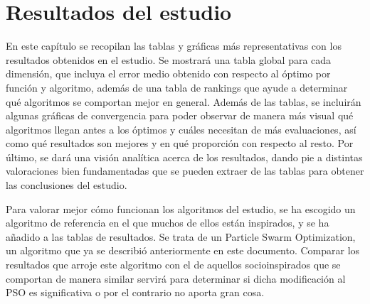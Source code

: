 \chapter{Resultados del estudio}

En este capítulo se recopilan las tablas y gráficas más representativas con los resultados obtenidos en el estudio. Se mostrará una tabla global para cada dimensión, que incluya el error medio obtenido con respecto al óptimo por función y algoritmo, además de una tabla de rankings que ayude a determinar qué algoritmos se comportan mejor en general. Además de las tablas, se incluirán algunas gráficas de convergencia para poder observar de manera más visual qué algoritmos llegan antes a los óptimos y cuáles necesitan de más evaluaciones, así como qué resultados son mejores y en qué proporción con respecto al resto. Por último, se dará una visión analítica acerca de los resultados, dando pie a distintas valoraciones bien fundamentadas que se pueden extraer de las tablas para obtener las conclusiones del estudio.

Para valorar mejor cómo funcionan los algoritmos del estudio, se ha escogido un algoritmo de referencia en el que muchos de ellos están inspirados, y se ha añadido a las tablas de resultados. Se trata de un Particle Swarm Optimization, un algoritmo que ya se describió anteriormente en este documento. Comparar los resultados que arroje este algoritmo con el de aquellos socioinspirados que se comportan de manera similar servirá para determinar si dicha modificación al PSO es significativa o por el contrario no aporta gran cosa.


